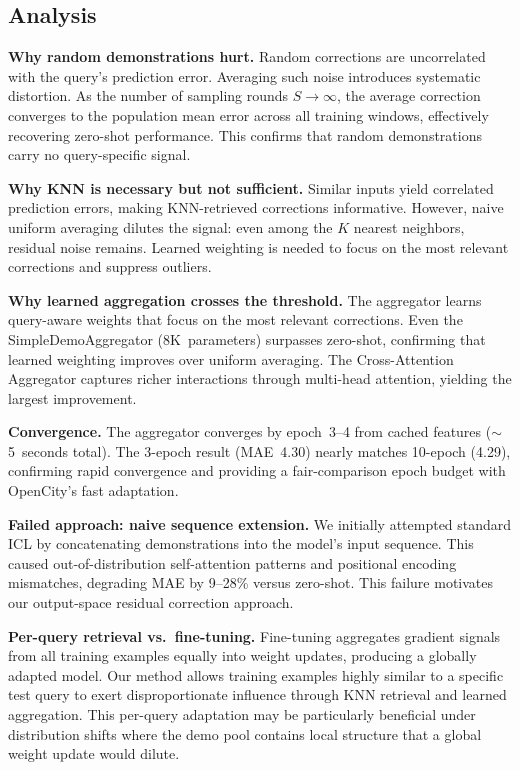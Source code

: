 \documentclass[conference]{IEEEtran}
\begin{document}
\subsection{Analysis}
\label{sec:analysis}

\textbf{Why random demonstrations hurt.}
Random corrections are uncorrelated with the query's prediction error.
Averaging such noise introduces systematic distortion.
As the number of sampling rounds $S \to \infty$, the average correction converges to the population mean error across all training windows, effectively recovering zero-shot performance.
This confirms that random demonstrations carry no query-specific signal.

\textbf{Why KNN is necessary but not sufficient.}
Similar inputs yield correlated prediction errors, making KNN-retrieved corrections informative.
However, naive uniform averaging dilutes the signal: even among the $K$ nearest neighbors, residual noise remains.
Learned weighting is needed to focus on the most relevant corrections and suppress outliers.

\textbf{Why learned aggregation crosses the threshold.}
The aggregator learns query-aware weights that focus on the most relevant corrections.
Even the SimpleDemoAggregator (8K~parameters) surpasses zero-shot, confirming that learned weighting improves over uniform averaging.
The Cross-Attention Aggregator captures richer interactions through multi-head attention, yielding the largest improvement.

\textbf{Convergence.}
The aggregator converges by epoch~3--4 from cached features (${\sim}$5~seconds total).
The 3-epoch result (MAE~4.30) nearly matches 10-epoch (4.29), confirming rapid convergence and providing a fair-comparison epoch budget with OpenCity's fast adaptation.

\textbf{Failed approach: naive sequence extension.}
We initially attempted standard ICL by concatenating demonstrations into the model's input sequence.
This caused out-of-distribution self-attention patterns and positional encoding mismatches, degrading MAE by 9--28\% versus zero-shot.
This failure motivates our output-space residual correction approach.

\textbf{Per-query retrieval vs.\ fine-tuning.}
Fine-tuning aggregates gradient signals from all training examples equally into weight updates, producing a globally adapted model.
Our method allows training examples highly similar to a specific test query to exert disproportionate influence through KNN retrieval and learned aggregation.
This per-query adaptation may be particularly beneficial under distribution shifts where the demo pool contains local structure that a global weight update would dilute.
\end{document}
